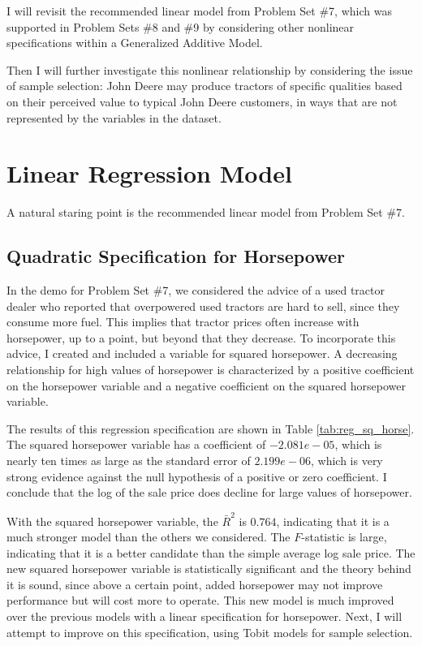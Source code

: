 \documentclass[11pt]{paper}
\begin{document}
I will revisit the recommended linear model
from Problem Set \#7, 
which was supported in
Problem Sets \#8 and  \#9 
by considering other nonlinear specifications
within a Generalized Additive Model. 




Then I will further investigate this nonlinear relationship
by considering the issue of sample selection:
John Deere 
may produce 
tractors 
of specific qualities based on
their perceived value to typical 
John Deere 
customers, 
in ways that are not represented by the variables in the dataset.



\clearpage
\section{Linear Regression Model}

A natural staring point is the recommended linear model
from Problem Set \#7. 

\subsection{Quadratic Specification for Horsepower}

In the demo for Problem Set \#7, 
we considered the advice of
a used tractor dealer who reported that overpowered used tractors are hard to sell, since they consume more fuel. 
This implies that tractor prices often increase with horsepower, up to a point, but beyond that they decrease. 
To incorporate this advice, I created and included a variable for squared horsepower. 
A decreasing relationship for high values of horsepower
is characterized by 
a positive coefficient on the horsepower variable and
a negative coefficient on the squared horsepower variable. 

% 

% 
The results of this regression specification are shown in 
Table \ref{tab:reg_sq_horse}. 
%
The squared horsepower variable has a coefficient of $-2.081e-05$, which is nearly ten times as large as the standard error of $2.199e-06$, which is very strong evidence against the null hypothesis of a positive or zero coefficient. 
I conclude that the log of the sale price does decline for large values of horsepower. 


With the squared horsepower variable, the $\bar{R}^2$ is $0.764$, indicating that it is a much stronger model than the others we considered. 
The $F$-statistic is large, indicating that it is a better candidate than the simple average log sale price. 
The new squared horsepower variable is statistically significant and the theory behind it is sound, since above a certain point, added horsepower may not improve performance but will cost more to operate. 
This new model is much improved over the previous models with a linear specification for horsepower.
Next, I will attempt to improve on this specification, 
using Tobit models for sample selection. 
\end{document}
